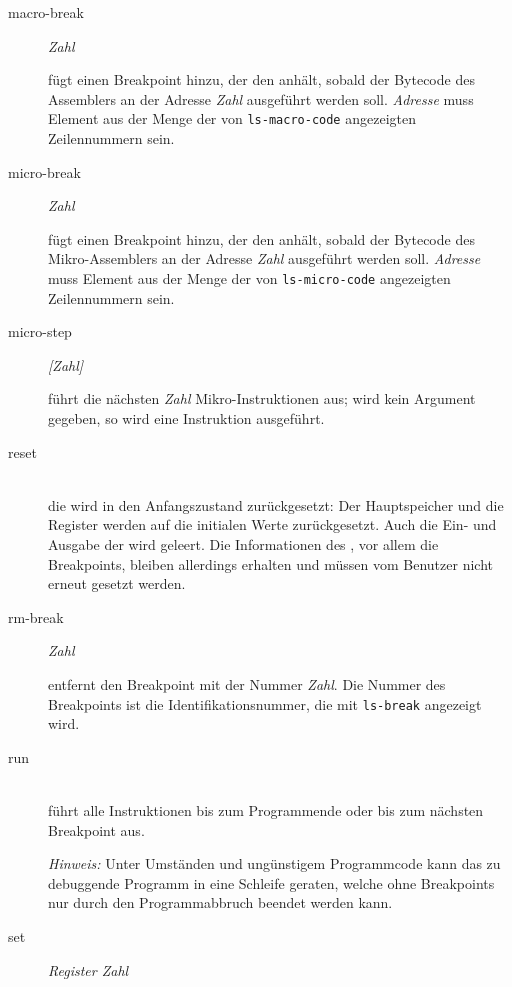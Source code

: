 \begin{description}
\item[macro-break] \emph{Zahl}

  fügt einen Breakpoint hinzu, der den \md{} anhält, sobald der Bytecode des Assemblers an der Adresse \emph{Zahl} ausgeführt werden soll. \emph{Adresse} muss Element aus der Menge der von \texttt{ls-macro-code} angezeigten Zeilennummern sein.

\item[micro-break] \emph{Zahl}

  fügt einen Breakpoint hinzu, der den \md{} anhält, sobald der Bytecode des Mikro-Assemblers an der Adresse \emph{Zahl} ausgeführt werden soll. \emph{Adresse} muss Element aus der Menge der von \texttt{ls-micro-code} angezeigten Zeilennummern sein.

\item[micro-step] \emph{[Zahl]}

  führt die nächsten \emph{Zahl} Mikro-Instruktionen aus; wird kein Argument gegeben, so wird eine Instruktion ausgeführt.

\item[reset] \hspace*{\fill}\\

  die \mic{} wird in den Anfangszustand zurückgesetzt: Der Hauptspeicher und die Register werden auf die initialen Werte zurückgesetzt. Auch die Ein- und Ausgabe der \mic{} wird geleert. Die Informationen des \md{}, vor allem die Breakpoints, bleiben allerdings erhalten und müssen vom Benutzer nicht erneut gesetzt werden.

\item[rm-break] \emph{Zahl}

  entfernt den Breakpoint mit der Nummer \emph{Zahl}. Die Nummer des Breakpoints ist die Identifikationsnummer, die mit \texttt{ls-break} angezeigt wird.

\item[run] \hspace*{\fill}\\
  
  führt alle Instruktionen bis zum Programmende oder bis zum nächsten Breakpoint aus.

  \emph{Hinweis:} Unter Umständen und ungünstigem Programmcode kann das zu debuggende Programm in eine Schleife geraten, welche ohne Breakpoints nur durch den Programmabbruch beendet werden kann.

\item[set] \emph{Register Zahl}


\end{description}
